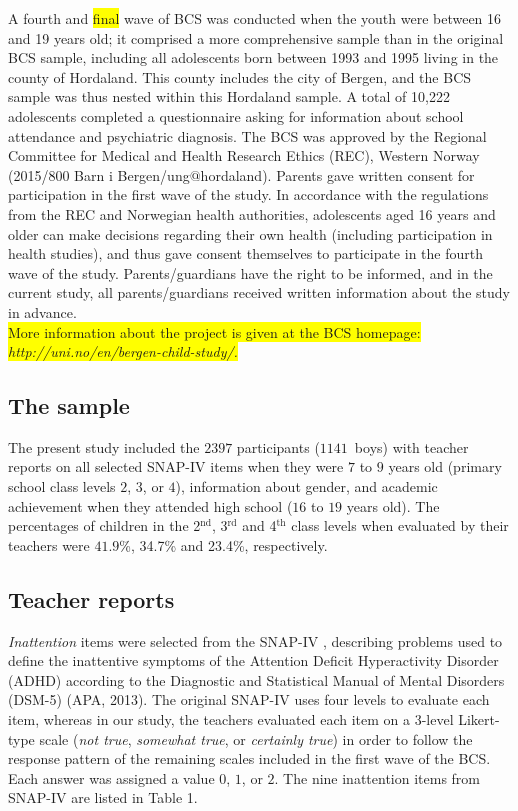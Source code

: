 \documentclass[10pt,letterpaper]{article}
\begin{document}
A fourth and \colorbox{yellow}{final} wave of BCS was conducted when the youth were between 16 and 19 years old; it comprised a more comprehensive sample than in the original BCS sample, including all adolescents born between 1993 and 1995 living in the county of Hordaland. This county includes the city of Bergen, and the BCS sample was thus nested within this Hordaland sample. A total of 10,222 adolescents completed a questionnaire asking for information about school attendance and psychiatric diagnosis. The BCS was approved by the Regional Committee for Medical and Health Research Ethics (REC), Western Norway (2015/800 Barn i Bergen/ung$@$hordaland). Parents gave written consent for participation in the first wave of the study. In accordance with the regulations from the REC and Norwegian health authorities, adolescents aged 16 years and older can make decisions regarding their own health (including participation in health studies), and thus gave consent themselves to participate in the fourth wave of the study. Parents/guardians have the right to be informed, and in the current study, all parents/guardians received written information about the study in advance.\\

\colorbox{yellow}{More information about the project is given at the BCS homepage:} \colorbox{yellow}{\em http://uni.no/en/bergen-child-study/.}

\vspace{3mm}
\subsection*{The sample}
The present study included the $2397$ participants ($1141$\ boys) with teacher reports on all selected SNAP-IV items when they were $7$ to $9$ years old (primary school class levels $2$, $3$, or $4$), information about gender, and academic achievement when they attended high school ($16$ to $19$ years old). 
The percentages of children in the 2$^{\text{nd}}$, 3$^{\text{rd}}$ and 4$^{\text{th}}$ class levels when evaluated by their teachers were 
$41.9$\%, 34.7\% and 23.4\%, respectively.


\vspace{3mm}
\subsection*{Teacher reports}
\emph{Inattention} items were selected from the SNAP-IV \cite{Swanson1992}, describing problems used to define the inattentive symptoms of the Attention Deficit Hyperactivity Disorder (ADHD) according to the Diagnostic and Statistical Manual of Mental Disorders (DSM-5) (APA, 2013). The original SNAP-IV uses four levels to evaluate each item, whereas in our study, the teachers evaluated each item on a 3-level Likert-type scale (\emph{not true}, \emph{somewhat true}, or \emph{certainly true}) in order to follow the response pattern of the remaining scales included in the first wave of the BCS. Each answer was assigned a value $0$, $1$, or $2$. 
The  nine inattention items from SNAP-IV are listed in Table 1. 
\end{document}
